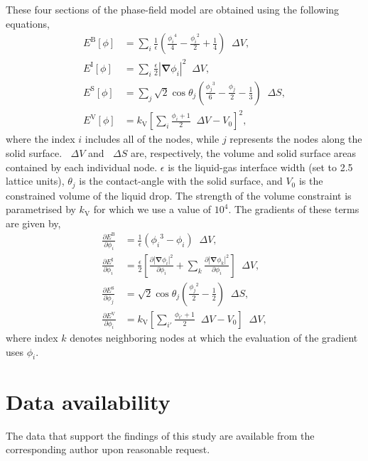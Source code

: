\documentclass[twocolumn,10pt]{revtex4}
\newcommand{\bm}[1]{\boldsymbol{\mathbf{#1}}}
\newcommand{\abs}[1]{\left| #1 \right|}
\newcommand{\grad}{\bm{\nabla}}
\newcommand{\upDelta}{\mathop{}\!\Delta}
\begin{document}
These four sections of the phase-field model are obtained using the following equations,
\begin{align}
  E^\mathrm{B}[\phi] &= \sum_i \frac{1}{\epsilon} \left( \frac{{\phi_i}^4}{4} - \frac{{\phi_i}^2}{2} + \frac{1}{4} \right) \upDelta V,\\
  E^\mathrm{I}[\phi] &= \sum_i \frac{\epsilon}{2} \abs{\grad \phi_i}^2 \upDelta V,\\
  E^\mathrm{S}[\phi] &= \sum_j \sqrt{2}\cos\theta_j \left( \frac{{\phi_j}^3}{6} - \frac{\phi_j}{2} - \frac{1}{3} \right) \upDelta S,\\
  E^\mathrm{V}[\phi] &= k_\mathrm{V} \left[ \sum_i \frac{\phi_i + 1}{2} \upDelta V - V_0 \right]^2,
\end{align}
where the index $i$ includes all of the nodes, while $j$ represents the nodes along the solid surface.
$\upDelta V$ and $\upDelta S$ are, respectively, the volume and solid surface areas contained by each individual node.
$\epsilon$ is the liquid-gas interface width (set to 2.5 lattice units), $\theta_j$ is the contact-angle with the solid surface, and $V_0$ is the constrained volume of the liquid drop.
The strength of the volume constraint is parametrised by $k_\mathrm{V}$ for which we use a value of $10^4$.
The gradients of these terms are given by,
\begin{align}
  \frac{\partial E^\mathrm{B}}{\partial \phi_i} &= \frac{1}{\epsilon} \left( {\phi_i}^3 - \phi_i \right) \upDelta V,\\
  \frac{\partial E^\mathrm{I}}{\partial \phi_i} &= \frac{\epsilon}{2} \left[
    \frac{\partial \abs{\grad \phi_i}^2}{\partial \phi_i} +
    \sum_k\frac{\partial \abs{\grad \phi_k}^2}{\partial \phi_i} \right] \upDelta V,\\
  \frac{\partial E^\mathrm{S}}{\partial \phi_j} &= \sqrt{2}\cos\theta_j \left( \frac{{\phi_j}^2}{2} - \frac{1}{2} \right) \upDelta S,\\
  \frac{\partial E^\mathrm{V}}{\partial \phi_i} &= k_\mathrm{V} \left[ \sum_{i'} \frac{\phi_{i'} + 1}{2} \upDelta V - V_0 \right] \upDelta V,
\end{align}
where index $k$ denotes neighboring nodes at which the evaluation of the gradient uses $\phi_i$.


\section*{Data availability}
The data that support the findings of this study are available from the corresponding author upon reasonable request.
\end{document}
